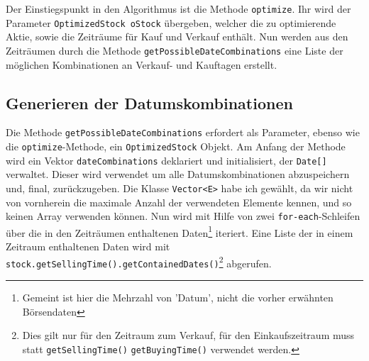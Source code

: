 \documentclass[12pt, a4paper, titlepage]{report}
\begin{document}
            Der Einstiegspunkt in den Algorithmus ist die Methode \texttt{optimize}.
            Ihr wird der Parameter \texttt{OptimizedStock oStock} übergeben, welcher
            die zu optimierende Aktie, sowie die Zeiträume für Kauf und Verkauf enthält.
            Nun werden aus den Zeiträumen durch die Methode \texttt{getPossibleDateCombinations}
            eine Liste der möglichen Kombinationen an Verkauf- und Kauftagen erstellt.
            
            \subsection{Generieren der Datumskombinationen}
            Die Methode \texttt{getPossibleDateCombinations} erfordert als Parameter, ebenso
            wie die \texttt{optimize}-Methode, ein \texttt{OptimizedStock} Objekt.
            Am Anfang der Methode wird ein Vektor \texttt{dateCombinations} deklariert
            und initialisiert, der \texttt{Date[]} verwaltet. Dieser wird verwendet um
            alle Datumskombinationen abzuspeichern und, final, zurückzugeben. Die
            Klasse \texttt{Vector<E>} habe ich gewählt, da wir nicht von vornherein
            die maximale Anzahl der verwendeten Elemente kennen, und so keinen Array
            verwenden können.
            Nun wird mit Hilfe von zwei \texttt{for-each}-Schleifen über die in den
            Zeiträumen enthaltenen Daten\footnote{Gemeint ist hier die Mehrzahl von 'Datum',
            nicht die vorher erwähnten Börsendaten} iteriert.
            Eine Liste der in einem Zeitraum enthaltenen Daten wird mit
            \texttt{stock.getSellingTime().getContainedDates()}\footnote{Dies gilt nur
            für den Zeitraum zum Verkauf, für den Einkaufszeitraum muss statt
            \texttt{getSellingTime()} \texttt{getBuyingTime()} verwendet werden.} abgerufen.
            
\end{document}
